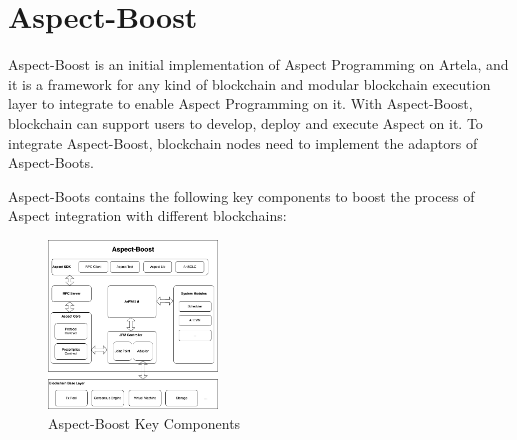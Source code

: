 \section{Aspect-Boost}
Aspect-Boost is an initial implementation of Aspect Programming on Artela, and it is a framework for any kind of blockchain and modular blockchain execution layer to integrate to enable Aspect Programming on it. With Aspect-Boost, blockchain can support users to develop, deploy and execute Aspect on it. To integrate Aspect-Boost, blockchain nodes need to implement the adaptors of Aspect-Boots.

Aspect-Boots contains the following key components to boost the process of Aspect integration with different blockchains:

\begin{figure}[h]
  \centering
  \includegraphics[width=0.4\textwidth]{sections/aspect-boost.png}
  \caption{Aspect-Boost Key Components}
\end{figure}

